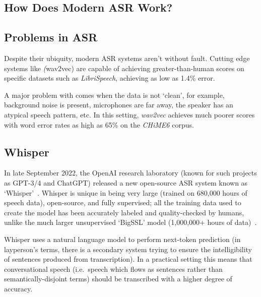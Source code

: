 \subsection{How Does Modern ASR Work?}

\subsection{Problems in ASR}

Despite their ubiquity, modern ASR systems aren't without fault.
Cutting edge systems like \emph(wav2vec) are capable of achieving greater-than-human scores on specific datasets\cite{wav2vec2,bigssl,chung2021} such as \emph{LibriSpeech}\cite{librispeech}, achieving as low as 1.4\% error\cite{zhang2020}.

A major problem with comes when the data is not `clean', for example, background noise is present, microphones are far away, the speaker has an atypical speech pattern, etc. 
In this setting, \emph{wav2vec} achieves much poorer scores with word error rates as high as 65\%\cite{whisper} on the \emph{CHiME6} corpus\cite{chime6}.


\subsection{Whisper}

In late September 2022, the OpenAI research laboratory (known for such projects as GPT-3/4 and ChatGPT) released a new open-source ASR system known as `Whisper'~\cite{whisper}.
Whisper is unique in being very large (trained on 680,000 hours of speech data), open-source, and fully supervised;
all the training data used to create the model has been accurately labeled and
quality-checked by humans, unlike the much larger unsupervised `BigSSL' model (1,000,000+ hours of data)~\cite{bigssl}.

Whisper uses a natural language model to perform next-token prediction (in layperson's terms, there is a secondary system trying to ensure the intelligibility of sentences produced from transcription).
In a practical setting this means that conversational speech (i.e.\ speech which flows as sentences rather than semantically-disjoint terms) should be transcribed with a higher degree of accuracy.


